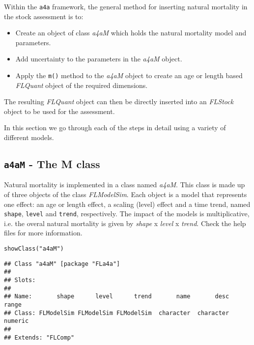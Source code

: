 \documentclass[a4paper,english,10pt]{article}\usepackage[]{graphicx}\usepackage[]{color}
\makeatletter
\newcommand{\hlstr}[1]{\textcolor[rgb]{0.2,0.2,0.2}{#1}}%
\newcommand{\hlstd}[1]{\textcolor[rgb]{0,0,0}{#1}}%
\newcommand{\hlkwd}[1]{\textcolor[rgb]{0.361,0.506,0.596}{#1}}%
\newenvironment{kframe}{%
 \def\at@end@of@kframe{}%
 \ifinner\ifhmode%
  \def\at@end@of@kframe{\end{minipage}}%
  \begin{minipage}{\columnwidth}%
 \fi\fi%
 \def\FrameCommand##1{\hskip\@totalleftmargin \hskip-\fboxsep
 \colorbox{shadecolor}{##1}\hskip-\fboxsep
     \hskip-\linewidth \hskip-\@totalleftmargin \hskip\columnwidth}%
 \MakeFramed {\advance\hsize-\width
   \@totalleftmargin\z@ \linewidth\hsize
   \@setminipage}}%
 {\par\unskip\endMakeFramed%
 \at@end@of@kframe}
\newenvironment{knitrout}{}{} %
\newcommand{\initiative}[1]{{\texttt{#1}}}
\newcommand{\code}[1]{{\texttt{#1}}}
\newcommand{\class}[1]{{\textit{#1}}}
\makeatother
\begin{document}
Within the \initiative{a4a} framework, the general method for inserting natural mortality in the stock assessment is to:

\begin{itemize}
    \item Create an object of class \class{a4aM} which holds the natural mortality model and parameters.
    \item Add uncertainty to the parameters in the \class{a4aM} object.
    \item Apply the \code{m()} method to the \class{a4aM} object to create an age or length based \class{FLQuant} object of the required dimensions.
\end{itemize}

The resulting \class{FLQuant} object can then be directly inserted into an \class {FLStock} object to be used for the assessment.   

In this section we go through each of the steps in detail using a variety of different models.

\subsection{\code{a4aM} - The M class}

Natural mortality is implemented in a class named \class{a4aM}. This class is made up of three objects of the class \class{FLModelSim}. Each object is a model that represents one effect: an age or length effect, a scaling (level) effect and a time trend, named \code{shape}, \code{level} and \code{trend}, respectively. The impact of the models is multiplicative, i.e. the overal natural mortality is given by \class{shape} x  \class{level} x \class{trend}. Check the help files for more information.

\begin{knitrout}
\color{fgcolor}\begin{kframe}
\begin{alltt}
\hlkwd{showClass}\hlstd{(}\hlstr{"a4aM"}\hlstd{)}
\end{alltt}
\begin{verbatim}
## Class "a4aM" [package "FLa4a"]
## 
## Slots:
##                                                                         
## Name:       shape      level      trend       name       desc      range
## Class: FLModelSim FLModelSim FLModelSim  character  character    numeric
## 
## Extends: "FLComp"
\end{verbatim}
\end{kframe}
\end{knitrout}
\end{document}

